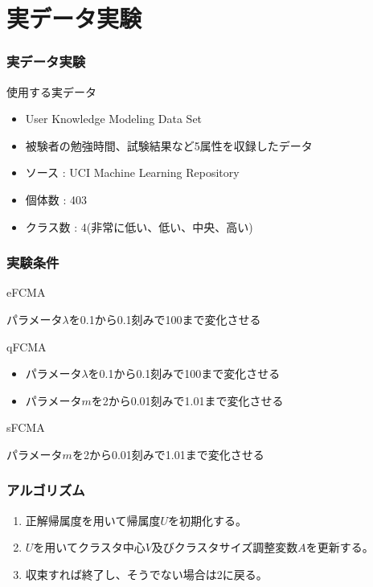 \documentclass[13pt,dvipdfmx]{beamer}
\begin{document}
\section{実データ実験}
\begin{frame}\frametitle{実データ実験}
  \begin{block}{使用する実データ}
    \begin{itemize}
     \item User Knowledge Modeling Data Set
     \item 被験者の勉強時間、試験結果など5属性を収録したデータ
     \item ソース : UCI  Machine Learning Repository
     \item 個体数 : 403
     \item クラス数 : 4(非常に低い、低い、中央、高い)
    \end{itemize}
  \end{block}
\end{frame}

\begin{frame}\frametitle{実験条件}
  \begin{block}{eFCMA}
    \begin{center}
      パラメータ$\lambda$を0.1から0.1刻みで100まで変化させる
    \end{center}
  \end{block}
  \begin{block}{qFCMA}
    \begin{itemize}
      \item パラメータ$\lambda$を0.1から0.1刻みで100まで変化させる
      \item パラメータ$m$を2から0.01刻みで1.01まで変化させる
    \end{itemize}
  \end{block}
  \begin{block}{sFCMA}
    \begin{center}
      パラメータ$m$を2から0.01刻みで1.01まで変化させる
    \end{center}
  \end{block}
\end{frame}

\begin{frame}\frametitle{アルゴリズム}
  \begin{enumerate}
  \item 正解帰属度を用いて帰属度$U$を初期化する。
  \item $U$を用いてクラスタ中心$V$及びクラスタサイズ調整変数$A$を更新する。
  \item 収束すれば終了し、そうでない場合は$2$に戻る。
  \end{enumerate}
\end{frame}
\end{document}

